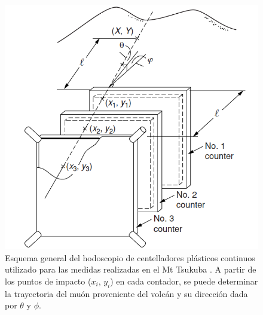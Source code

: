\documentclass[12pt,oneside,openany,letter]{book}
\begin{document}
\begin{figure}
\begin{center}
\includegraphics[scale=0.4]{images/hodoscopio_general.png}
\caption[Esquema general de un hodoscopio]{Esquema general del hodoscopio de centelladores plásticos continuos utilizado para las medidas realizadas en el Mt Tsukuba \cite{nagamine_2003}. A partir de los puntos de impacto ($x_i$, $y_i$) en cada contador, se puede determinar la trayectoria del muón proveniente del volcán y su dirección dada por $\theta$ y $\phi$.}
\label{hodoscopio_general}
\end{center}
\end{figure}
\end{document}

